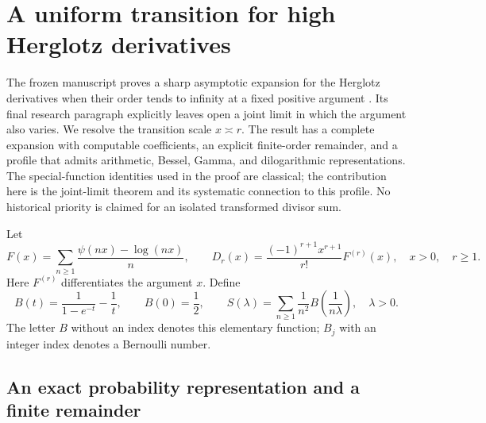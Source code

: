 
\section{A uniform transition for high Herglotz derivatives}
\label{herg:sec:transition}

The frozen manuscript proves a sharp asymptotic expansion for the
Herglotz derivatives when their order tends to infinity at a fixed
positive argument \cite{repoHerglotz}. Its final research paragraph explicitly leaves open
a joint limit in which the argument also varies. We resolve the
transition scale $x\asymp r$. The result has a complete expansion with
computable coefficients, an explicit finite-order remainder, and a
profile that admits arithmetic, Bessel, Gamma, and dilogarithmic
representations. The special-function identities used in the proof are
classical; the contribution here is the joint-limit theorem and its
systematic connection to this profile. No historical priority is claimed
for an isolated transformed divisor sum.

Let
\begin{equation}\label{herg:eq:F}
 F(x)=\sum_{n\geq1}\frac{\psi(nx)-\log(nx)}{n},\qquad
 D_r(x)=\frac{(-1)^{r+1}x^{r+1}}{r!}F^{(r)}(x),
 \quad x>0,\quad r\geq1.
\end{equation}
Here $F^{(r)}$ differentiates the argument $x$. Define
\begin{equation}\label{herg:eq:Bprofile}
 B(t)=\frac{1}{1-e^{-t}}-\frac1t,\qquad B(0)=\frac12,
 \qquad
 S(\lambda)=\sum_{n\geq1}\frac1{n^2}
                       B\left(\frac1{n\lambda}\right),\quad\lambda>0.
\end{equation}
The letter $B$ without an index denotes this elementary function;
$B_j$ with an integer index denotes a Bernoulli number.

\subsection{An exact probability representation and a finite remainder}

